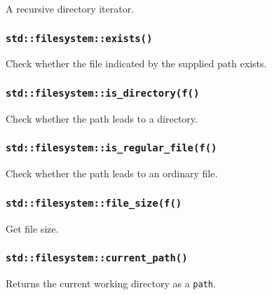 \documentclass[8pt, table, xcdraw]{article}%
\begin{document}
A recursive directory iterator.

\subsubsection{\lstinline{std::filesystem::exists()}}

Check whether the file indicated by the supplied path exists.

\subsubsection{\lstinline{std::filesystem::is_directory(f()}}

Check whether the path leads to a directory.

\subsubsection{\lstinline{std::filesystem::is_regular_file(f()}}

Check whether the path leads to an ordinary file.

\subsubsection{\lstinline{std::filesystem::file_size(f()}}

Get file size.

\subsubsection{\lstinline{std::filesystem::current_path()}}

Returns the current working directory as a \lstinline{path}.
\end{document}
